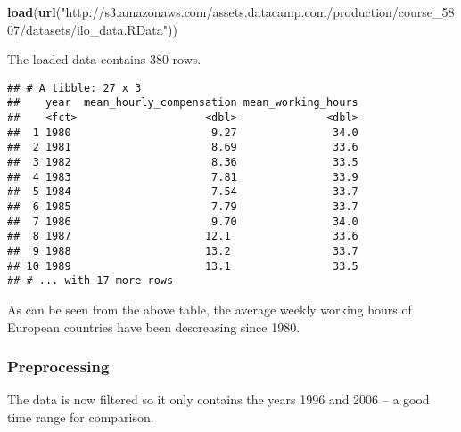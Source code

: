 \documentclass[]{article}
\newenvironment{Shaded}{\begin{snugshade}}{\end{snugshade}}
\newcommand{\KeywordTok}[1]{\textcolor[rgb]{0.13,0.29,0.53}{\textbf{#1}}}
\newcommand{\DataTypeTok}[1]{\textcolor[rgb]{0.13,0.29,0.53}{#1}}
\newcommand{\StringTok}[1]{\textcolor[rgb]{0.31,0.60,0.02}{#1}}
\newcommand{\CommentTok}[1]{\textcolor[rgb]{0.56,0.35,0.01}{\textit{#1}}}
\newcommand{\OperatorTok}[1]{\textcolor[rgb]{0.81,0.36,0.00}{\textbf{#1}}}
\newcommand{\NormalTok}[1]{#1}
\begin{document}
\begin{Shaded}
\begin{Highlighting}[]
\KeywordTok{load}\NormalTok{(}\KeywordTok{url}\NormalTok{(}\StringTok{"http://s3.amazonaws.com/assets.datacamp.com/production/course_5807/datasets/ilo_data.RData"}\NormalTok{))}
\end{Highlighting}
\end{Shaded}

The loaded data contains 380 rows.

\begin{Shaded}
\end{Shaded}

\begin{verbatim}
## # A tibble: 27 x 3
##    year  mean_hourly_compensation mean_working_hours
##    <fct>                    <dbl>              <dbl>
##  1 1980                      9.27               34.0
##  2 1981                      8.69               33.6
##  3 1982                      8.36               33.5
##  4 1983                      7.81               33.9
##  5 1984                      7.54               33.7
##  6 1985                      7.79               33.7
##  7 1986                      9.70               34.0
##  8 1987                     12.1                33.6
##  9 1988                     13.2                33.7
## 10 1989                     13.1                33.5
## # ... with 17 more rows
\end{verbatim}

As can be seen from the above table, the average weekly working hours of
European countries have been descreasing since 1980.

\subsubsection{Preprocessing}\label{preprocessing}

The data is now filtered so it only contains the years 1996 and 2006 --
a good time range for comparison.
\end{document}
